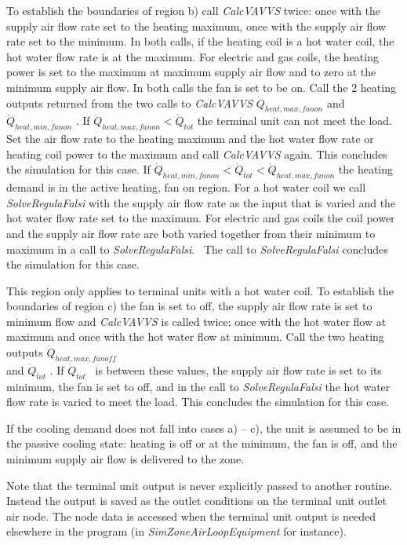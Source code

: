 To establish the boundaries of region b) call \emph{CalcVAVVS} twice: once with the supply air flow rate set to the heating maximum, once with the supply air flow rate set to the minimum. In both calls, if the heating coil is a hot water coil, the hot water flow rate is at the maximum. For electric and gas coils, the heating power is set to the maximum at maximum supply air flow and to zero at the minimum supply air flow. In both calls the fan is set to be on. Call the 2 heating outputs returned from the two calls to \emph{CalcVAVVS} \({\dot Q_{heat,max,fanon}}\) and \({\dot Q_{heat,min,fanon}}\) . If \({\dot Q_{heat,max,fanon}} < {\dot Q_{tot}}\) the terminal unit can not meet the load. Set the air flow rate to the heating maximum and the hot water flow rate or heating coil power to the maximum and call \emph{CalcVAVVS} again. This concludes the simulation for this case. If \({\dot Q_{heat,min,fanon}} < {\dot Q_{tot}} < {\dot Q_{heat,max,fanon}}\) the heating demand is in the active heating, fan on region. For a hot water coil we call \emph{SolveRegulaFalsi} with the supply air flow rate as the input that is varied and the hot water flow rate set to the maximum. For electric and gas coils the coil power and the supply air flow rate are both varied together from their minimum to maximum in a call to \emph{SolveRegulaFalsi}.~ The call to \emph{SolveRegulaFalsi} concludes the simulation for this case.

This region only applies to terminal units with a hot water coil. To establish the boundaries of region c) the fan is set to off, the supply air flow rate is set to minimum flow and \emph{CalcVAVVS} is called twice: once with the hot water flow at maximum and once with the hot water flow at minimum. Call the two heating outputs \({\dot Q_{heat,max,fanoff}}\)\\
and \({\dot Q_{tot}}\) . If \({\dot Q_{tot}}\) ~is between these values, the supply air flow rate is set to its minimum, the fan is set to off, and in the call to \emph{SolveRegulaFalsi} the hot water flow rate is varied to meet the load. This concludes the simulation for this case.

If the cooling demand does not fall into cases a) -- c), the unit is assumed to be in the passive cooling state: heating is off or at the minimum, the fan is off, and the minimum supply air flow is delivered to the zone.

Note that the terminal unit output is never explicitly passed to another routine. Instead the output is saved as the outlet conditions on the terminal unit outlet air node. The node data is accessed when the terminal unit output is needed elsewhere in the program (in \emph{SimZoneAirLoopEquipment} for instance).

